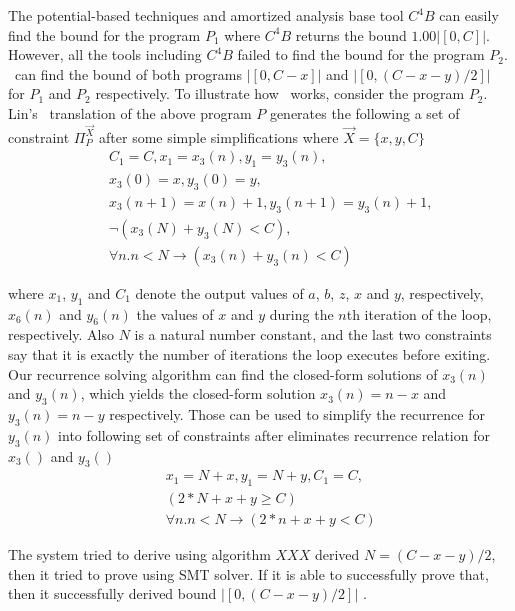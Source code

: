 The potential-based techniques and amortized analysis base tool $C^{4}B$ can easily find the bound for the program $P_1$ where $C^{4}B$ returns the bound $1.00 |[0, C]|$. 
However, all the tools including $C^{4}B$ failed to find the bound for the program $P_2$. 
\SystemName\ can find the bound of both programs $ |[0, C-x]|$ and $ |[0, (C-x-y)/2]|$ for $P_1$ and $P_2$ respectively. 
To illustrate how \SystemName\ works, consider the program $P_2$. Lin's~\cite{Lin20161} translation of the above program $P$ generates the following a set of constraint $\Pi^{\vec{X}}_{P}$ after some simple simplifications where $\vec{X}=\{x,y,C\}$
\begin{eqnarray*}
	&& C_1=C , x_1 = x_3(n), y_1 = y_3(n), \\
	&& x_3(0) = x, y_3(0) = y, \\
	&& x_3(n+1) = x(n)+1, y_3(n+1) = y_3(n)+1, \\
	&&\neg (x_3(N)+y_3(N)<C), \\
	&& \forall n. n<N\rightarrow (x_3(n)+y_3(n)<C)
\end{eqnarray*}

where  $x_1$, $y_1$ and $C_1$ denote the output values of $a$, $b$, $z$, $x$ and $y$, respectively,
$x_6(n)$ and $y_6(n)$ the values of $x$ and $y$ during the $n$th iteration
of the loop, respectively. Also
$N$ is a natural number constant, and the last two constraints say that it
is exactly the number of iterations the loop executes before exiting. Our recurrence solving algorithm can find the closed-form solutions of $x_3(n)$ and $y_3(n)$, which yields the closed-form solution $x_3(n)=n-x$ and $y_3(n)=n-y$ respectively. Those can be used to simplify the recurrence for $y_3(n)$ into following set of constraints after eliminates recurrence relation for $x_3()$ and $y_3()$
\begin{eqnarray*}
	&& x_1 = N+x, y_1 = N+y, C_1=C,\\
	&& (2*N+x+y \geq C) \\
	&& \forall n. n<N\rightarrow (2*n+x+y<C)
\end{eqnarray*}

The system tried to derive using algorithm $XXX$ derived $N=(C-x-y)/2$, then it tried to prove using SMT solver. 
If it is able to successfully prove that, then it successfully derived bound $ |[0, (C-x-y)/2]|$ .


